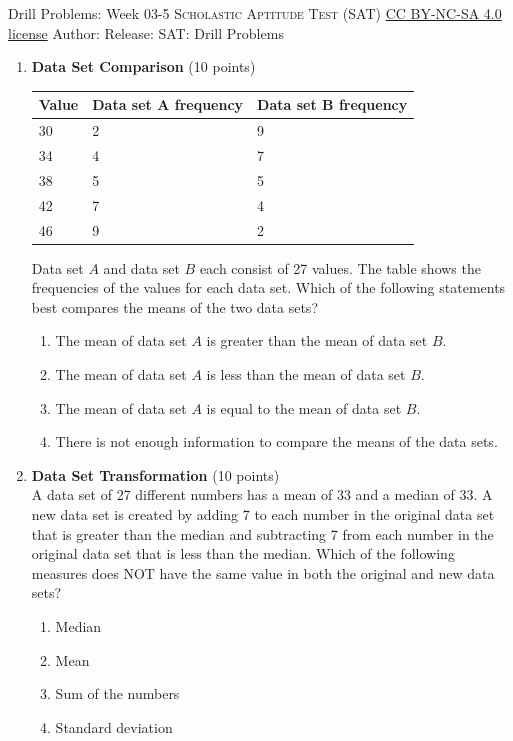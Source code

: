 \newpage\handout
{Drill Problems: Week 03-5}
{\textsc{Scholastic Aptitude Test (SAT)}}
{\href{https://creativecommons.org/licenses/by-nc-sa/4.0/}{CC BY-NC-SA 4.0 license}}
{Author: \BookAuthor}{Release: \generatedOn}
{SAT: Drill Problems}


\begin{enumerate}
  \item \textbf{Data Set Comparison} (10 points)\\
  \begin{center}
  \begin{tabular}{|l|l|l|}
  \hline
  Value & Data set A frequency & Data set B frequency \\
  \hline
  30 & 2 & 9 \\
  \hline
  34 & 4 & 7 \\
  \hline
  38 & 5 & 5 \\
  \hline
  42 & 7 & 4 \\
  \hline
  46 & 9 & 2 \\
  \hline
  \end{tabular}
  \end{center}

  Data set $A$ and data set $B$ each consist of 27 values. The table shows the frequencies of the values for each data set. Which of the following statements best compares the means of the two data sets?
  \begin{enumerate}[label=(\Alph*)]
    \item The mean of data set $A$ is greater than the mean of data set $B$.
    \item The mean of data set $A$ is less than the mean of data set $B$.
    \item The mean of data set $A$ is equal to the mean of data set $B$.
    \item There is not enough information to compare the means of the data sets.
  \end{enumerate}
  \begin{subanswer}
  \end{subanswer}

  \item \textbf{Data Set Transformation} (10 points)\\
  A data set of 27 different numbers has a mean of 33 and a median of 33. A new data set is created by adding 7 to each number in the original data set that is greater than the median and subtracting 7 from each number in the original data set that is less than the median. Which of the following measures does NOT have the same value in both the original and new data sets?
  \begin{enumerate}[label=(\Alph*)]
    \item Median
    \item Mean
    \item Sum of the numbers
    \item Standard deviation
  \end{enumerate}
  \begin{subanswer}
  \end{subanswer}


\end{enumerate}

